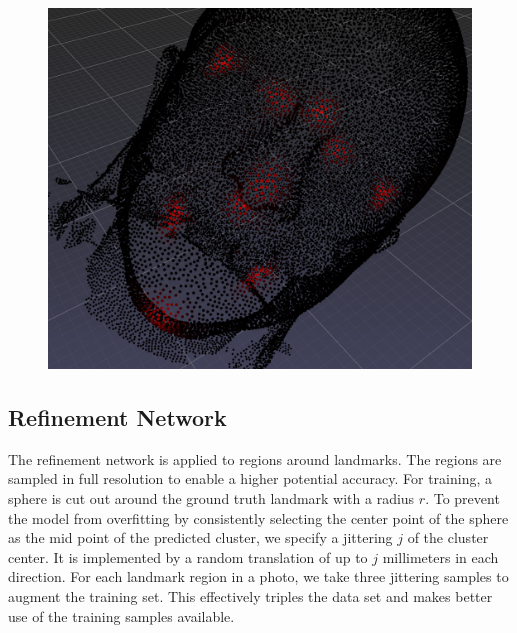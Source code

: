 \documentclass[class=article, crop=false]{standalone}
\begin{document}
\begin{figure}[htb]
  \centering
  \includegraphics[width=\linewidth]{thesis/methods/import/imgs/pred_hs_clusters.png}
  \label{fig:pred_hs_clusters}
\end{figure}

\subsection{Refinement Network}
The refinement network is applied to regions around landmarks. The regions are sampled in full resolution to enable a higher potential accuracy. For training, a sphere is cut out around the ground truth landmark with a radius $r$. To prevent the model from overfitting by consistently selecting the center point of the sphere as the mid point of the predicted cluster, we specify a jittering $j$ of the cluster center. It is implemented by a random translation of up to $j$ millimeters in each direction. For each landmark region in a photo, we take three jittering samples to augment the training set. This effectively triples the data set and makes better use of the training samples available.
\end{document}
